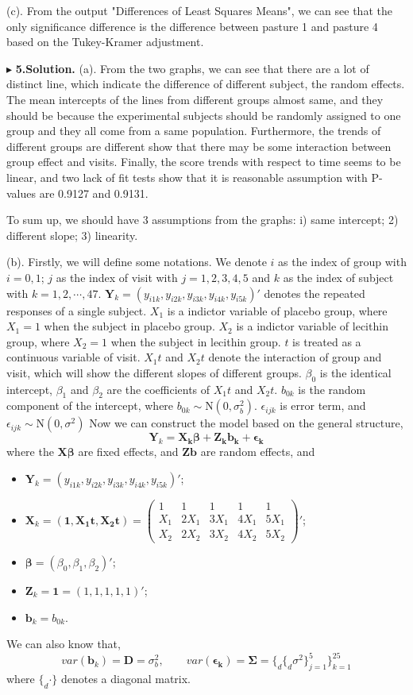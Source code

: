\documentclass[letterpaper, 12pt]{article}
\newcommand{\lma}{\left(\begin{matrix}}
\newcommand{\rma}{\end{matrix}\right)}
\begin{document}
(c). From the output "Differences of Least Squares Means", we can see that the only significance difference is the difference between pasture 1 and pasture 4 based on the Tukey-Kramer adjustment.


$\blacktriangleright$ \textbf{5.\quad Solution.}
(a). From the two graphs, we can see that there are a lot of distinct line, which indicate the difference of different subject, the random effects. The mean intercepts of the lines from different groups almost same, and they should be because the experimental subjects should be randomly assigned to one group and they all come from a same population. Furthermore, the trends of different groups are different show that there may be some interaction between group effect and visits. Finally, the score trends with respect to time seems to be linear, and two lack of fit tests show that it is reasonable assumption with P-values are 0.9127 and 0.9131.

To sum up, we should have 3 assumptions from the graphs: i) same intercept; 2) different slope; 3) linearity.





(b). Firstly, we will define some notations. We denote $i$ as the index of group with $i=0,1$; $j$ as the index of visit with $j=1,2,3,4,5$ and $k$ as the index of subject with $k=1,2,\cdots,47$. $\bm{Y}_{k}=(y_{i1k},y_{i2k},y_{i3k},y_{i4k},y_{i5k})'$ denotes the repeated responses of a single subject. $X_1$ is a indictor variable of placebo group, where $X_{1}=1$ when the subject in placebo group. $X_2$ is a indictor variable of lecithin group, where $X_{2}=1$ when the subject in lecithin group. $t$ is treated as a continuous variable of visit. $X_1t$  and $X_2t$ denote the interaction of group and visit, which will show the different slopes of different groups. $\beta_0$ is the identical intercept, $\beta_1$ and $\beta_2$ are the coefficients of $X_1t$  and $X_2t$. $b_{0k}$ is the random component of the intercept, where $b_{0k}\sim \text{N}(0,\sigma_b^2)$. $\epsilon_{ijk}$ is error term, and $\epsilon_{ijk}\sim \text{N}(0,\sigma^2)$ Now we can construct the model based on the general structure,
$$
\bm{Y}_k=\bm{X_k\beta+Z_kb_k+\epsilon_k}
$$
where the $\bm{X\beta}$ are fixed effects, and $\bm{Zb}$ are random effects, and 
\begin{itemize}
\item $\bm{Y}_k=(y_{i1k},y_{i2k},y_{i3k},y_{i4k},y_{i5k})'$;
\item $\bm{X}_k=(\bm{1},\bm{X_1t},\bm{X_2t})=\lma
1&1&1&1&1\\
X_{1}&2X_{1}&3X_{1}&4X_{1}&5X_{1}\\
X_{2}&2X_{2}&3X_{2}&4X_{2}&5X_{2}\rma'$;
\item $\bm{\beta}=(\beta_0,\beta_1,\beta_2)'$;
\item $\bm{Z}_k=\bm{1}=(1,1,1,1,1)'$;
\item $\bm{b}_k=b_{0k}$.
\end{itemize}
We can also know that,
$$
var(\bm{b}_k)=\bm{D}=\sigma_b^2,\qquad var(\bm{\epsilon_k})=\bm{\Sigma}=\big\{_d\{_d \sigma^2\}_{j=1}^5\big\}_{k=1}^{25}
$$
where $\{_d \cdot\}$ denotes a diagonal matrix.
\end{document}

